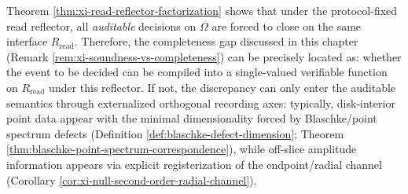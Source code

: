 \begin{remark}\label{rem:xi-read-reflector-completeness}
Theorem \ref{thm:xi-read-reflector-factorization} shows that under the protocol-fixed read reflector, all \emph{auditable} decisions on \(\Omega\) are forced to close on the same interface \(R_{\mathrm{read}}\).
Therefore, the completeness gap discussed in this chapter (Remark \ref{rem:xi-soundness-vs-completeness}) can be precisely located as: whether the event to be decided can be compiled into a single-valued verifiable function on \(R_{\mathrm{read}}\) under this reflector.
If not, the discrepancy can only enter the auditable semantics through externalized orthogonal recording axes: typically, disk-interior point data appear with the minimal dimensionality forced by Blaschke/point spectrum defects (Definition \ref{def:blaschke-defect-dimension}; Theorem \ref{thm:blaschke-point-spectrum-correspondence}), while off-slice amplitude information appears via explicit registerization of the endpoint/radial channel (Corollary \ref{cor:xi-null-second-order-radial-channel}).
\end{remark}


